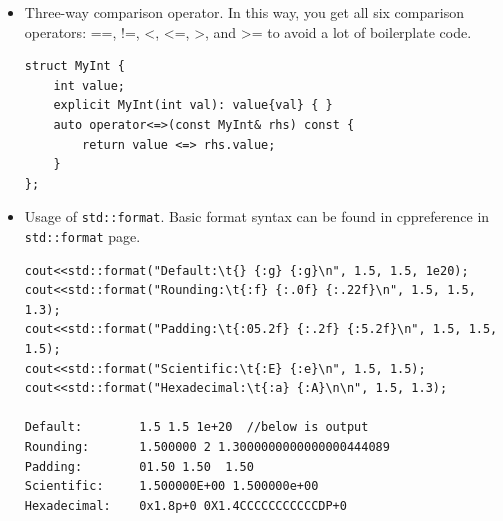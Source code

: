 \documentclass[a4paper,11pt,twoside]{book}
\begin{document}
\begin{itemize}
	
	\item Three-way comparison operator. In this way, you get all six comparison operators: ==, !=, <, <=, >, and >= to avoid a lot of boilerplate code.
	
	
\begin{lstlisting}
struct MyInt {
    int value;
    explicit MyInt(int val): value{val} { }
    auto operator<=>(const MyInt& rhs) const {  
        return value <=> rhs.value;
    }
};
\end{lstlisting}	

    \item Usage of \texttt{std::format}. Basic format syntax can be found in cppreference in \texttt{std::format} page.
\begin{lstlisting}[]
cout<<std::format("Default:\t{} {:g} {:g}\n", 1.5, 1.5, 1e20);
cout<<std::format("Rounding:\t{:f} {:.0f} {:.22f}\n", 1.5, 1.5, 1.3);
cout<<std::format("Padding:\t{:05.2f} {:.2f} {:5.2f}\n", 1.5, 1.5, 1.5);
cout<<std::format("Scientific:\t{:E} {:e}\n", 1.5, 1.5);
cout<<std::format("Hexadecimal:\t{:a} {:A}\n\n", 1.5, 1.3);

Default:        1.5 1.5 1e+20  //below is output
Rounding:       1.500000 2 1.3000000000000000444089
Padding:        01.50 1.50  1.50
Scientific:     1.500000E+00 1.500000e+00
Hexadecimal:    0x1.8p+0 0X1.4CCCCCCCCCCCDP+0
\end{lstlisting}

\end{itemize}
\end{document}
